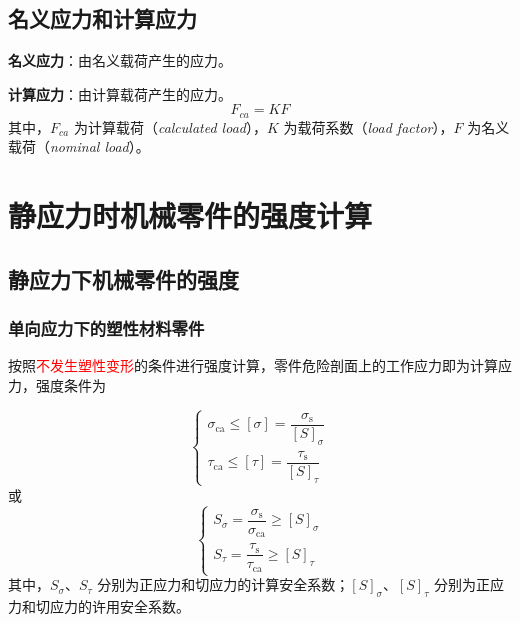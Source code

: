 \subsection{名义应力和计算应力}
\label{subsec:名义应力和计算应力}

\begin{definition}[名义应力]
\label{def:名义应力}
\textbf{名义应力}：由名义载荷产生的应力。
\end{definition}

\begin{definition}[计算应力]
\label{def:计算应力}
\textbf{计算应力}：由计算载荷产生的应力。
\begin{equation}
	F_{ca}=KF
	\label{eq:强度:计算载荷}
\end{equation}
其中，$F_{ca}$ 为计算载荷（\emph{calculated load}），$K$ 为载荷系数（\emph{load factor}），$F$ 为名义载荷（\emph{nominal load}）。
\end{definition}

\section{静应力时机械零件的强度计算}
\label{sec:静应力时的强度计算}

\subsection{静应力下机械零件的强度}

\subsubsection{单向应力下的塑性材料零件}

按照\textcolor{red}{不发生塑性变形}的条件进行强度计算，零件危险剖面上的工作应力即为计算应力，强度条件为

\begin{theorem}[单向应力塑性材料零件的强度条件]
\label{thm:单向静应力强度}
\begin{equation}
	\begin{cases}
		\sigma_{\mathrm{ca}} \le [\sigma] = \dfrac{\sigma_{\mathrm{s}}}{[S]_\sigma} \\[2ex]
		\tau_{\mathrm{ca}} \le [\tau] = \dfrac{\tau_{\mathrm{s}}}{[S]_\tau}
	\end{cases}
	\label{eq:强度:单向静应力强度}
\end{equation}
或
\begin{equation}
	\begin{cases}
		S_{\sigma} = \dfrac{\sigma_{\mathrm{s}}}{\sigma_{\mathrm{ca}}} \ge [S]_\sigma \\[2ex]
		S_{\tau} = \dfrac{\tau_{\mathrm{s}}}{\tau_{\mathrm{ca}}} \ge [S]_\tau
	\end{cases}
	\label{eq:强度:单向静应力安全系数}
\end{equation}
其中，$S_\sigma$、$S_\tau$ 分别为正应力和切应力的计算安全系数；$[S]_\sigma$、$[S]_\tau$ 分别为正应力和切应力的许用安全系数。
\end{theorem}


